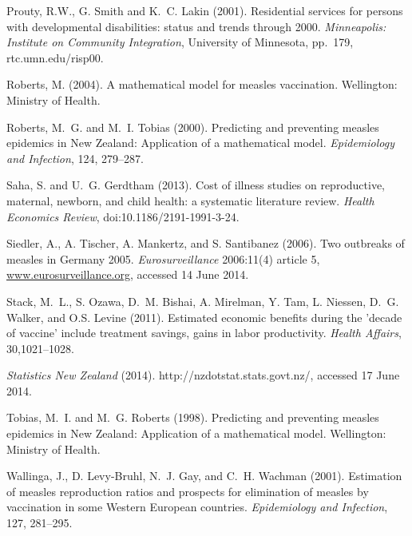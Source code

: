 \documentclass{article}
\begin{document}
\begin{thebibliography}{}
Prouty, R.W., G. Smith and K.~C. Lakin (2001).
\newblock Residential services for persons with developmental disabilities: status and trends through 2000.
\newblock \emph{Minneapolis: Institute on Community Integration}, University of Minnesota, pp.~179, rtc.umn.edu/risp00.

Roberts, M. (2004).
\newblock A mathematical model for measles vaccination.
\newblock Wellington: Ministry of Health.

Roberts, M.~G. and M.~I. Tobias (2000).
\newblock Predicting and preventing measles epidemics in New Zealand: Application of a mathematical model. 
\newblock \emph{Epidemiology and Infection}, 124, 279--287.

Saha, S. and U.~G. Gerdtham (2013).
\newblock Cost of illness studies on reproductive, maternal, newborn, and child health: a systematic literature review.
\newblock \emph{Health Economics Review}, doi:10.1186/2191-1991-3-24.

Siedler, A., A. Tischer, A. Mankertz, and S. Santibanez (2006).
\newblock Two outbreaks of measles in Germany 2005.
\newblock \emph{Eurosurveillance} 2006:11(4) article 5, \href{http://www.eurosurveillance.org/ViewArticle.aspx?ArticleId=615}{www.eurosurveillance.org}, accessed 14 June 2014.

Stack, M.~L., S. Ozawa, D.~M. Bishai, A. Mirelman, Y. Tam, L. Niessen, D.~G. Walker, and O.S. Levine (2011).
\newblock Estimated economic benefits during the 'decade of vaccine' include treatment savings, gains in labor productivity.
\newblock \emph{Health Affairs}, 30,1021--1028.

\newblock \emph{Statistics New Zealand} (2014).
http://nzdotstat.stats.govt.nz/, accessed 17 June 2014.

Tobias, M.~I. and M.~G. Roberts (1998).
\newblock Predicting and preventing measles epidemics in New Zealand: Application of a mathematical model.
\newblock Wellington: Ministry of Health.

Wallinga, J., D. Levy-Bruhl, N.~J. Gay, and C.~H. Wachman (2001).
\newblock Estimation of measles reproduction ratios and prospects for elimination of measles by vaccination in some Western European countries.
\newblock \emph{Epidemiology and Infection}, 127, 281--295.


\end{thebibliography}
\end{document}

